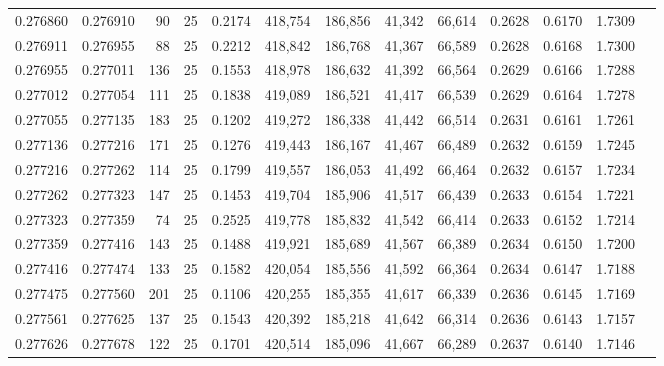 \begin{tabular}{rrrrrrrrrrrrr}
0.276860 & 0.276910 &    90 &  25 &                                     0.2174 & 418,754 & 186,856 &  41,342 &  66,614 & 0.2628 & 0.6170 & 1.7309 \\
0.276911 & 0.276955 &    88 &  25 &                                     0.2212 & 418,842 & 186,768 &  41,367 &  66,589 & 0.2628 & 0.6168 & 1.7300 \\
0.276955 & 0.277011 &   136 &  25 &                                     0.1553 & 418,978 & 186,632 &  41,392 &  66,564 & 0.2629 & 0.6166 & 1.7288 \\
0.277012 & 0.277054 &   111 &  25 &                                     0.1838 & 419,089 & 186,521 &  41,417 &  66,539 & 0.2629 & 0.6164 & 1.7278 \\
0.277055 & 0.277135 &   183 &  25 &                                     0.1202 & 419,272 & 186,338 &  41,442 &  66,514 & 0.2631 & 0.6161 & 1.7261 \\
0.277136 & 0.277216 &   171 &  25 &                                     0.1276 & 419,443 & 186,167 &  41,467 &  66,489 & 0.2632 & 0.6159 & 1.7245 \\
0.277216 & 0.277262 &   114 &  25 &                                     0.1799 & 419,557 & 186,053 &  41,492 &  66,464 & 0.2632 & 0.6157 & 1.7234 \\
0.277262 & 0.277323 &   147 &  25 &                                     0.1453 & 419,704 & 185,906 &  41,517 &  66,439 & 0.2633 & 0.6154 & 1.7221 \\
0.277323 & 0.277359 &    74 &  25 &                                     0.2525 & 419,778 & 185,832 &  41,542 &  66,414 & 0.2633 & 0.6152 & 1.7214 \\
0.277359 & 0.277416 &   143 &  25 &                                     0.1488 & 419,921 & 185,689 &  41,567 &  66,389 & 0.2634 & 0.6150 & 1.7200 \\
0.277416 & 0.277474 &   133 &  25 &                                     0.1582 & 420,054 & 185,556 &  41,592 &  66,364 & 0.2634 & 0.6147 & 1.7188 \\
0.277475 & 0.277560 &   201 &  25 &                                     0.1106 & 420,255 & 185,355 &  41,617 &  66,339 & 0.2636 & 0.6145 & 1.7169 \\
0.277561 & 0.277625 &   137 &  25 &                                     0.1543 & 420,392 & 185,218 &  41,642 &  66,314 & 0.2636 & 0.6143 & 1.7157 \\
0.277626 & 0.277678 &   122 &  25 &                                     0.1701 & 420,514 & 185,096 &  41,667 &  66,289 & 0.2637 & 0.6140 & 1.7146 \\

\end{tabular}
